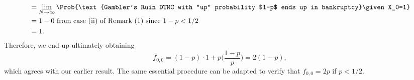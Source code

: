 \begin{enumerate}[(1)]
\begin{align*}
               & =\lim\limits_{{N} \to {\infty}}\Prob{\text{Gambler's Ruin DTMC with ``up'' probability $1-p$ ends up in bankruptcy}\given X_0=1} \\
               & =1-0\text{ from case (ii) of Remark (1) since $1-p<1/2$}                                                                         \\
               & =1.
          \end{align*}
          Therefore, we end up ultimately obtaining
          \[ f_{0,0}=(1-p)\cdot 1+p\biggl(\frac{1-p}{p}\biggr)=2(1-p), \]
          which agrees with our earlier result. The same essential procedure can be adapted to verify
          that $ f_{0,0}=2p $ if $ p<1/2 $.
\end{enumerate}